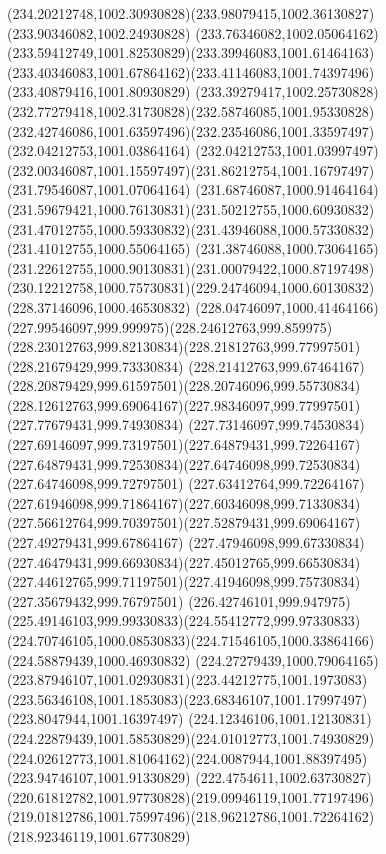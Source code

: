 {{	\curveto(234.20212748,1002.30930828)(233.98079415,1002.36130827)(233.90346082,1002.24930828)
	\curveto(233.76346082,1002.05064162)(233.59412749,1001.82530829)(233.39946083,1001.61464163)
	\curveto(233.40346083,1001.67864162)(233.41146083,1001.74397496)(233.40879416,1001.80930829)
	\curveto(233.39279417,1002.25730828)(232.77279418,1002.31730828)(232.58746085,1001.95330828)
	\curveto(232.42746086,1001.63597496)(232.23546086,1001.33597497)(232.04212753,1001.03864164)
	\lineto(232.04212753,1001.03997497)
	\curveto(232.00346087,1001.15597497)(231.86212754,1001.16797497)(231.79546087,1001.07064164)
	\curveto(231.68746087,1000.91464164)(231.59679421,1000.76130831)(231.50212755,1000.60930832)
	\curveto(231.47012755,1000.59330832)(231.43946088,1000.57330832)(231.41012755,1000.55064165)
	\curveto(231.38746088,1000.73064165)(231.22612755,1000.90130831)(231.00079422,1000.87197498)
	\curveto(230.12212758,1000.75730831)(229.24746094,1000.60130832)(228.37146096,1000.46530832)
	\curveto(228.04746097,1000.41464166)(227.99546097,999.999975)(228.24612763,999.859975)
	\curveto(228.23012763,999.82130834)(228.21812763,999.77997501)(228.21679429,999.73330834)
	\curveto(228.21412763,999.67464167)(228.20879429,999.61597501)(228.20746096,999.55730834)
	\curveto(228.12612763,999.69064167)(227.98346097,999.77997501)(227.77679431,999.74930834)
	\curveto(227.73146097,999.74530834)(227.69146097,999.73197501)(227.64879431,999.72264167)
	\curveto(227.64879431,999.72530834)(227.64746098,999.72530834)(227.64746098,999.72797501)
	\curveto(227.63412764,999.72264167)(227.61946098,999.71864167)(227.60346098,999.71330834)
	\curveto(227.56612764,999.70397501)(227.52879431,999.69064167)(227.49279431,999.67864167)
	\curveto(227.47946098,999.67330834)(227.46479431,999.66930834)(227.45012765,999.66530834)
	\curveto(227.44612765,999.71197501)(227.41946098,999.75730834)(227.35679432,999.76797501)
	\curveto(226.42746101,999.947975)(225.49146103,999.99330833)(224.55412772,999.97330833)
	\curveto(224.70746105,1000.08530833)(224.71546105,1000.33864166)(224.58879439,1000.46930832)
	\curveto(224.27279439,1000.79064165)(223.87946107,1001.02930831)(223.44212775,1001.1973083)
	\curveto(223.56346108,1001.1853083)(223.68346107,1001.17997497)(223.8047944,1001.16397497)
	\curveto(224.12346106,1001.12130831)(224.22879439,1001.58530829)(224.01012773,1001.74930829)
	\curveto(224.02612773,1001.81064162)(224.0087944,1001.88397495)(223.94746107,1001.91330829)
	\curveto(222.4754611,1002.63730827)(220.61812782,1001.97730828)(219.09946119,1001.77197496)
	\curveto(219.01812786,1001.75997496)(218.96212786,1001.72264162)(218.92346119,1001.67730829)
}}
